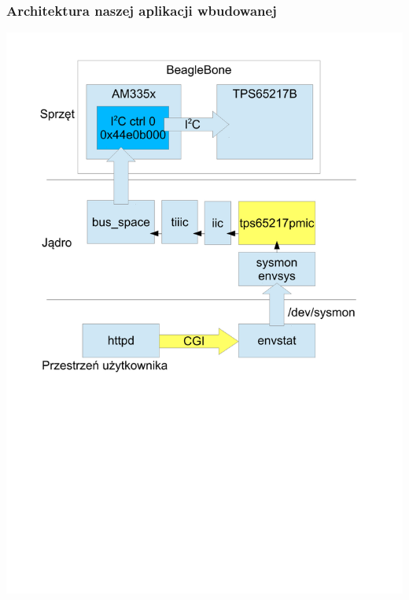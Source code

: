 \documentclass[dvipsnames,table]{beamer}
\begin{document}
\begin{frame}
\frametitle{Architektura naszej aplikacji wbudowanej}
\begin{center}
\includegraphics[scale=0.42]{img_apparch.pdf}
\end{center}
\end{frame}
\end{document}
